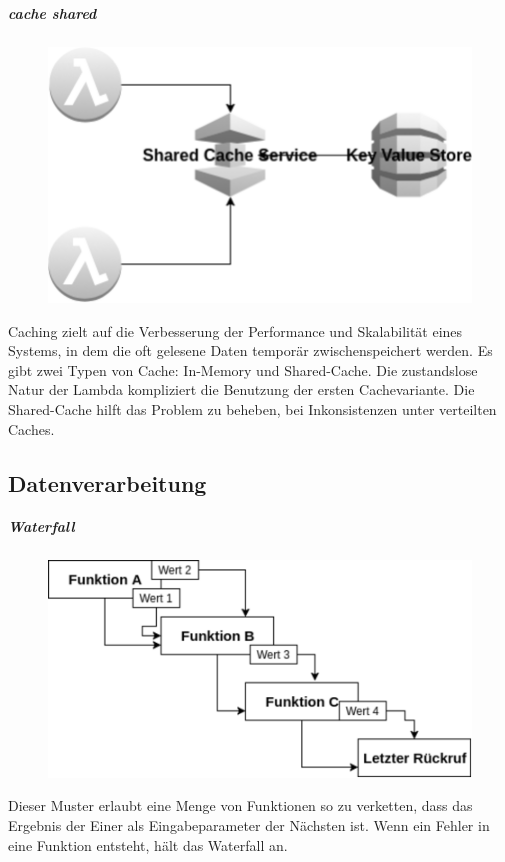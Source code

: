 \documentclass[
12pt,
english,
ngerman,
headsepline,
twoside,
openright,
numbers=noenddot,version=first
]{scrreprt}
\begin{document}
\subparagraph{cache shared }
\begin{figure}
	\includegraphics[scale=0.2]{./pics/aws/pattern-cache-shared.eps}
\end{figure}
Caching zielt auf die Verbesserung der Performance und Skalabilität eines Systems, in dem die oft gelesene Daten temporär zwischenspeichert werden. Es gibt zwei Typen von Cache: In-Memory und Shared-Cache. Die zustandslose Natur der Lambda kompliziert die Benutzung der ersten Cachevariante. 
Die Shared-Cache hilft das Problem zu beheben, bei Inkonsistenzen unter verteilten Caches. 


\subsection{Datenverarbeitung}

\subparagraph{Waterfall}
\begin{figure}
	\includegraphics[scale=0.2]{./pics/aws/pattern-waterfall.eps}
\end{figure}
Dieser Muster erlaubt eine Menge von Funktionen so zu verketten, dass das Ergebnis der Einer als Eingabeparameter der Nächsten ist. Wenn ein Fehler in eine Funktion entsteht, hält das Waterfall an.
\end{document}
